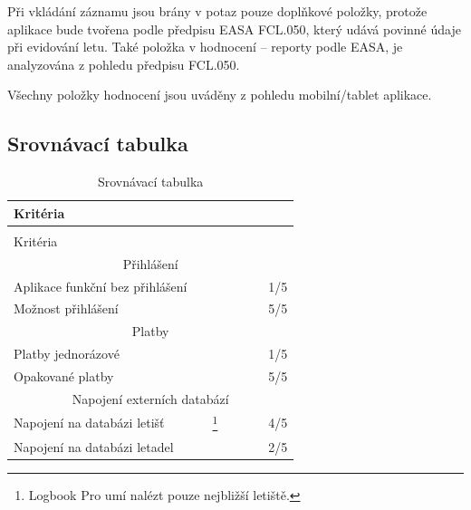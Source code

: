 \documentclass[thesis=M,czech]{FITthesis}[2012/06/26]
\begin{document}
Při vkládání záznamu jsou brány v potaz pouze doplňkové položky, protože aplikace bude tvořena podle předpisu EASA FCL.050, který udává povinné údaje při evidování letu. Také položka v hodnocení  -- reporty podle EASA, je analyzována z pohledu předpisu FCL.050. 

Všechny položky hodnocení jsou uváděny z pohledu mobilní/tablet aplikace.

\subsection{Srovnávací tabulka}
\newcommand{\OK}{\ding{51}}
\newcommand{\NOK}{\ding{55}}
\newcommand{\rot}{\rotatebox{90}}

{\setlength\extrarowheight{2pt}
\begin{longtable}{@{\extracolsep{\fill}}l c c c c c c}
   \caption[Srovnávací tabulka]{Srovnávací tabulka}\label{tab:srovnavaci_tabulka} \\
   Kritéria & \rot{Log Ten Pro X} & \rot{Logbook Pro} & \rot{Safelog} &
   \rot{FlyLogio} & \rot{Smart Logbook} & \rot{Výsledek} \\
  \endfirsthead
   \caption[Srovnávací tabulka]{Srovnávací tabulka}\label{tab:srovnavaci_tabulka} \\
   Kritéria & \rot{Log Ten Pro X} & \rot{Logbook Pro} & \rot{Safelog} &
   \rot{FlyLogio} & \rot{Smart Logbook} & \rot{Výsledek} \\
  \endhead

   \hline
   \multicolumn{7}{c}{Přihlášení} \\
   \hline
   Aplikace funkční bez přihlášení 			 & \OK & \NOK & \NOK & \NOK & \NOK & 1/5 \\
   Možnost přihlášení								 & \OK & \OK & \OK & \OK & \OK  & 5/5 \\
   
   \hline
   \multicolumn{7}{c}{Platby} \\
   \hline
   Platby jednorázové			 & \NOK & \NOK & \NOK & \NOK & \OK & 1/5 \\
   Opakované platby			 & \OK & \OK & \OK & \OK & \OK  & 5/5 \\
   
   \hline
   \multicolumn{7}{c}{Napojení externích databází} \\
   \hline
   Napojení na databázi letišť		 & \NOK & \OK \footnote{Logbook Pro umí nalézt pouze nejbližší letiště.} & \OK & \OK & \OK & 4/5 \\
   Napojení na databázi letadel	 & \NOK & \NOK & \OK & \OK & \NOK  & 2/5 \\
   

\end{longtable}}
\end{document}
